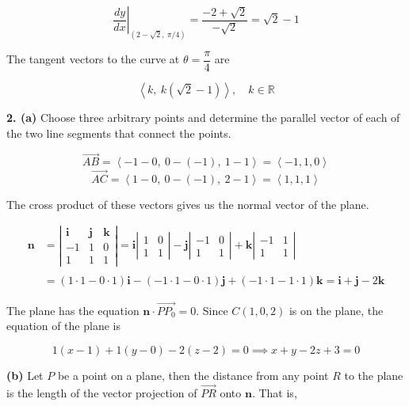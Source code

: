 \documentclass{article}
\begin{document}
\[\left.\frac{dy}{dx}\right|_{\left(2-\sqrt2,\:\pi/4\right)}=\frac{-2+\sqrt2}{-\sqrt2}=\sqrt2-1\]

The tangent vectors to the curve at $\theta=\dfrac\pi4$ are

\[\boxed{\left\langle k,\:k\left(\sqrt2-1\right)\right\rangle,\quad k\in\mathbb{R}}\]

\vspace{1em}

\textbf{2. (a)} Choose three arbitrary points and determine the parallel vector of each of the two line segments that connect the points.

\[\overrightarrow{AB}=\left\langle-1-0,\:0-(-1),\:1-1\right\rangle=\left\langle-1,1,0\right\rangle\]
\[\overrightarrow{AC}=\left\langle1-0,\:0-(-1),\:2-1\right\rangle=\left\langle1,1,1\right\rangle\]

The cross product of these vectors gives us the normal vector of the plane.

\begin{align*}\mathbf{n}&=\left|\begin{array}{ccc}
\mathbf{i}&\mathbf{j}&\mathbf{k}\\
-1&1&0\\
1&1&1
\end{array}\right|=\mathbf{i}\left|\begin{array}{cc}
1&0\\1&1
\end{array}\right|-\mathbf{j}\left|\begin{array}{cc}
-1&0\\1&1
\end{array}\right|+\mathbf{k}\left|\begin{array}{cc}
-1&1\\1&1
\end{array}\right|\\\\&=(1\cdot1-0\cdot1)\mathbf{i}-(-1\cdot1-0\cdot1)\mathbf{j}+(-1\cdot1-1\cdot1)\mathbf{k}=\mathbf i+\mathbf j-2\mathbf k\end{align*}

The plane has the equation $\mathbf n\cdot\overrightarrow{PP_0}=0$. Since $C(1,0,2)$ is on the plane, the equation of the plane is

\[\boxed{1(x-1)+1(y-0)-2(z-2)=0\implies x+y-2z+3=0}\]

\textbf{(b)} Let $P$ be a point on a plane, then the distance from any point $R$ to the plane is the length of the vector projection of $\overrightarrow{PR}$ onto $\mathbf n$. That is,
\end{document}

